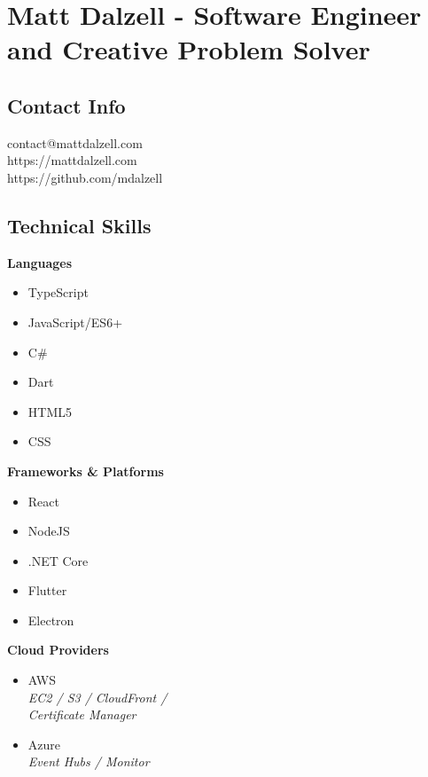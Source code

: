 \documentclass[10pt]{article}
\begin{document}

\section*{Matt Dalzell - {\large Software Engineer and Creative Problem Solver}}

\setlength{\columnsep}{4em}
\setlength{\columnseprule}{0.1pt}
\begin{paracol}{2}

\subsection*{Contact Info}
contact@mattdalzell.com \\ 
https://mattdalzell.com \\
https://github.com/mdalzell 

\subsection*{Technical Skills} 

\textbf{Languages}
\begin{itemize}
    \item TypeScript
    \item JavaScript/ES6+
    \item C\#
    \item Dart
    \item HTML5
    \item CSS
\end{itemize}

\noindent \textbf{Frameworks \& Platforms}
\begin{itemize}
    \item React
    \item NodeJS
    \item .NET Core
    \item Flutter
    \item Electron
\end{itemize}

\noindent \textbf{Cloud Providers}
\begin{itemize}
    \item AWS  \\ {\footnotesize{\textit{EC2 / S3 / CloudFront / \\ Certificate Manager}}}
    \item Azure \\ {\footnotesize{\textit{Event Hubs / Monitor}}}
\end{itemize}


\end{paracol}
\end{document}
